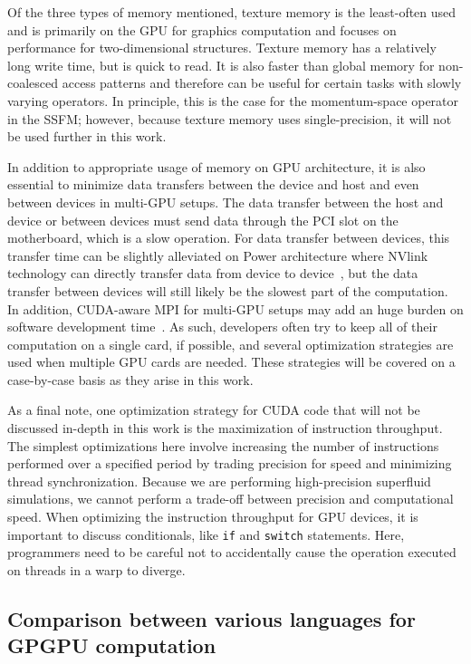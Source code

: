 Of the three types of memory mentioned, texture memory is the least-often used and is primarily on the GPU for graphics computation and focuses on performance for two-dimensional structures.
Texture memory has a relatively long write time, but is quick to read.
It is also faster than global memory for non-coalesced access patterns and therefore can be useful for certain tasks with slowly varying operators.
In principle, this is the case for the momentum-space operator in the SSFM; however, because texture memory uses single-precision, it will not be used further in this work.

In addition to appropriate usage of memory on GPU architecture, it is also essential to minimize data transfers between the device and host and even between devices in multi-GPU setups.
The data transfer between the host and device or between devices must send data through the PCI slot on the motherboard, which is a slow operation.
For data transfer between devices, this transfer time can be slightly alleviated on Power architecture where NVlink technology can directly transfer data from device to device~\cite{foley2017}, but the data transfer between devices will still likely be the slowest part of the computation.
In addition, CUDA-aware MPI for multi-GPU setups may add an huge burden on software development time~\cite{lonvcar2016, wang2013}.
As such, developers often try to keep all of their computation on a single card, if possible, and several optimization strategies are used when multiple GPU cards are needed.
These strategies will be covered on a case-by-case basis as they arise in this work.

As a final note, one optimization strategy for CUDA code that will not be discussed in-depth in this work is the maximization of instruction throughput.
The simplest optimizations here involve increasing the number of instructions performed over a specified period by trading precision for speed and minimizing thread synchronization.
Because we are performing high-precision superfluid simulations, we cannot perform a trade-off between precision and computational speed.
When optimizing the instruction throughput for GPU devices, it is important to discuss conditionals, like \texttt{if} and \texttt{switch} statements.
Here, programmers need to be careful not to accidentally cause the operation executed on threads in a warp to diverge.

\subsection{Comparison between various languages for GPGPU computation}
\label{sec:compare}

